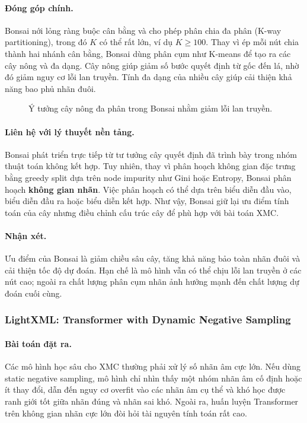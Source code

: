 \paragraph{Đóng góp chính.}
Bonsai nới lỏng ràng buộc cân bằng và cho phép phân chia đa phân (K-way partitioning), trong đó $K$ có thể rất lớn, ví dụ $K\geq 100$. Thay vì ép mỗi nút chia thành hai nhánh cân bằng, Bonsai dùng phân cụm như K-means để tạo ra các cây nông và đa dạng. Cây nông giúp giảm số bước quyết định từ gốc đến lá, nhờ đó giảm nguy cơ lỗi lan truyền. Tính đa dạng của nhiều cây giúp cải thiện khả năng bao phủ nhãn đuôi.
\begin{figure}[H]
\centering
\resizebox{0.98\textwidth}{!}{}
\caption{Ý tưởng cây nông đa phân trong Bonsai nhằm giảm lỗi lan truyền.}
\label{fig:xmc-bonsai-tree}
\end{figure}


\paragraph{Liên hệ với lý thuyết nền tảng.}
Bonsai phát triển trực tiếp từ tư tưởng cây quyết định đã trình bày trong nhóm thuật toán không kết hợp. Tuy nhiên, thay vì phân hoạch không gian đặc trưng bằng greedy split dựa trên node impurity như Gini hoặc Entropy, Bonsai phân hoạch \textbf{không gian nhãn}. Việc phân hoạch có thể dựa trên biểu diễn đầu vào, biểu diễn đầu ra hoặc biểu diễn kết hợp. Như vậy, Bonsai giữ lại ưu điểm tính toán của cây nhưng điều chỉnh cấu trúc cây để phù hợp với bài toán XMC.

\paragraph{Nhận xét.}
Ưu điểm của Bonsai là giảm chiều sâu cây, tăng khả năng bảo toàn nhãn đuôi và cải thiện tốc độ dự đoán. Hạn chế là mô hình vẫn có thể chịu lỗi lan truyền ở các nút cao; ngoài ra chất lượng phân cụm nhãn ảnh hưởng mạnh đến chất lượng dự đoán cuối cùng.

\subsubsection{LightXML: Transformer with Dynamic Negative Sampling}

\paragraph{Bài toán đặt ra.}
Các mô hình học sâu cho XMC thường phải xử lý số nhãn âm cực lớn. Nếu dùng static negative sampling, mô hình chỉ nhìn thấy một nhóm nhãn âm cố định hoặc ít thay đổi, dẫn đến nguy cơ overfit vào các nhãn âm cụ thể và khó học được ranh giới tốt giữa nhãn đúng và nhãn sai khó. Ngoài ra, huấn luyện Transformer trên không gian nhãn cực lớn đòi hỏi tài nguyên tính toán rất cao.

